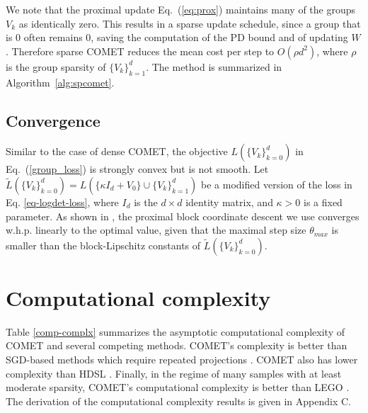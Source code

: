 \documentclass[twoside,11pt]{article}
\newcommand\mat[1]{{#1}}
\newcommand{\W}{\mat{W}}
\newcommand{\Vk}{\mat{V_k}}
\newcommand{\Vg}{\{\Vk\}_{k=0}^{d}} %
\newcommand{\Vgrc}{\{\Vk\}_{k=1}^{d}} %
\renewcommand{\eqref}[1]{Eq.~(\ref{#1})}
\begin{document}
We note that the proximal update \eqref{eq:prox} maintains many of the groups $V_k$ as identically zero. This results in a sparse update schedule, since a group that is $0$ often remains $0$, saving the computation of the PD bound and of updating $\W$. Therefore sparse COMET reduces the mean cost per step to $O(\rho d^2)$, where $\rho$ is the group sparsity of $\Vgrc$. The method is summarized in Algorithm~\ref{alg:spcomet}.

\subsection{Convergence}
Similar to the case of dense COMET, the objective $L(\Vg)$ in \eqref{group_loss} is strongly convex but is not smooth. Let $\tilde{L}(\Vg) = L(\{\kappa I_d + V_0\} \cup \{V_k\}_{k=1}^d)$ be a modified version of the loss in Eq. \ref{eq-logdet-loss}, where $I_d$ is the $d \times d$ identity matrix, and $\kappa>0$ is a fixed parameter.
As shown in \cite[Theorem 7]{richtarik2014iteration}, the proximal block coordinate descent we use converges w.h.p. linearly to the optimal value, given that the maximal step size $\theta_{max}$ is smaller than the block-Lipschitz constants of $\tilde{L}(\Vg)$.


\section{Computational complexity}

Table \ref{comp-complx} summarizes the asymptotic computational complexity of COMET and several competing methods. COMET's complexity is better than SGD-based methods which require repeated projections \citep{OASIS, qian}. COMET also has lower complexity than HDSL \citep{HDSL}.  Finally, in the regime of many samples with at least moderate sparsity, COMET's computational complexity is better than LEGO \citep{lego}. The derivation of the computational complexity results is given in Appendix C.
\end{document}
